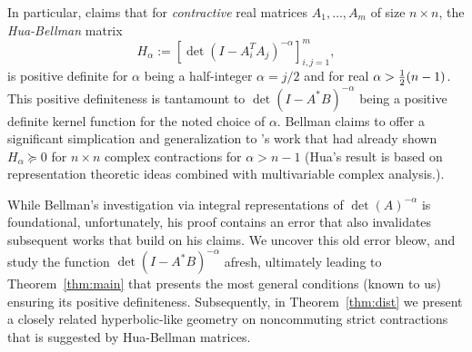 \documentclass[11pt]{article}
\begin{document}
In particular, \citet{bellman1959} claims that for \emph{contractive} real matrices $A_1,\ldots,A_m$ of size $n\times n$, the \emph{Hua-Bellman} matrix
\begin{equation}
  \label{eq:1}
  H_\alpha := [\det(I-A_i^TA_j)^{-\alpha}]_{i,j=1}^m,
\end{equation}
is positive definite for $\alpha$ being a half-integer $\alpha = j/2$ and for real $\alpha > \tfrac{1}{2}(n-1)$. This positive definiteness is tantamount to $\det(I-A^*B)^{-\alpha}$ being a positive definite kernel function for the noted choice of $\alpha$. %
Bellman claims to offer a significant simplication and generalization to \citet{hua1955}'s work that had already shown $H_\alpha \succeq 0$ for $n\times n$ complex contractions for $\alpha > n-1$ (Hua's result is based on representation theoretic ideas combined with multivariable complex analysis.). %

While Bellman's investigation via integral representations of $\det(A)^{-\alpha}$ is foundational, unfortunately, his proof contains an error that also invalidates subsequent works that build on his claims. We uncover this old error bleow, and study the function $\det(I-A^*B)^{-\alpha}$ afresh, ultimately leading to Theorem~\ref{thm:main} that presents the most general conditions (known to us)  ensuring its positive definiteness. Subsequently, in Theorem~\ref{thm:dist} we present a closely related hyperbolic-like geometry on noncommuting strict contractions that is suggested by Hua-Bellman matrices. 
\end{document}
